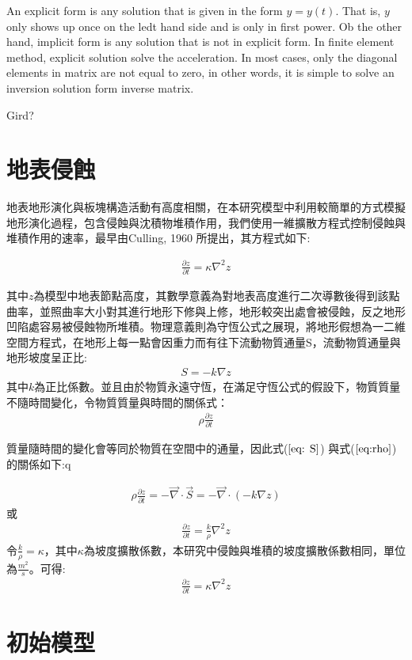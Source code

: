 An explicit form is any solution that is given in the form $y=y(t)$. That is, $y$ only shows up once on the ledt hand side and is only in first power. Ob the other hand, implicit form is any solution that is not in explicit form. In finite element method, explicit solution solve the acceleration. In most cases, only the diagonal elements in matrix are not equal to zero, in other words, it is simple to solve an inversion solution form inverse matrix. 

Gird?

\section{地表侵蝕}
地表地形演化與板塊構造活動有高度相關，在本研究模型中利用較簡單的方式模擬地形演化過程，包含侵蝕與沈積物堆積作用，我們使用一維擴散方程式控制侵蝕與堆積作用的速率，最早由Culling, 1960 所提出，其方程式如下:

\begin{align}
\frac{\partial z}{\partial t} = \kappa \nabla^2 z \label{eq: erosion}
\end{align}

其中$z$為模型中地表節點高度，其數學意義為對地表高度進行二次導數後得到該點曲率，並照曲率大小對其進行地形下修與上修，地形較突出處會被侵蝕，反之地形凹陷處容易被侵蝕物所堆積。物理意義則為守恆公式之展現，將地形假想為一二維空間方程式，在地形上每一點會因重力而有往下流動物質通量S，流動物質通量與地形坡度呈正比:
\begin{align}
S = -k\nabla z \label{eq: S}
\end{align}
其中$k$為正比係數。並且由於物質永遠守恆，在滿足守恆公式的假設下，物質質量不隨時間變化，令物質質量與時間的關係式：
\begin{align}
\rho\frac{\partial z}{\partial t}\label{eq:rho}
\end{align}

質量隨時間的變化會等同於物質在空間中的通量，因此式($\ref{eq: S}$) 與式($\ref{eq:rho}$) 的關係如下:q 

\begin{align}
\rho\frac{\partial z}{\partial t} = -\vec\nabla\cdot \vec S = -\vec\nabla \cdot (-k\nabla z)\label{eq:erosion2}
\end{align}
或
\begin{align}
\frac{\partial z}{\partial t} = \frac{k}{\rho}\nabla^2 z\label{eq:erosion3}
\end{align}
令$\frac{k}{\rho}=\kappa$，其中$\kappa$為坡度擴散係數，本研究中侵蝕與堆積的坡度擴散係數相同，單位為$\frac{m^2}{s}$。可得:
\begin{align}
\frac{\partial z}{\partial t} = \kappa\nabla^2 z\label{eq:erosion4}
\end{align}

\section{初始模型}
